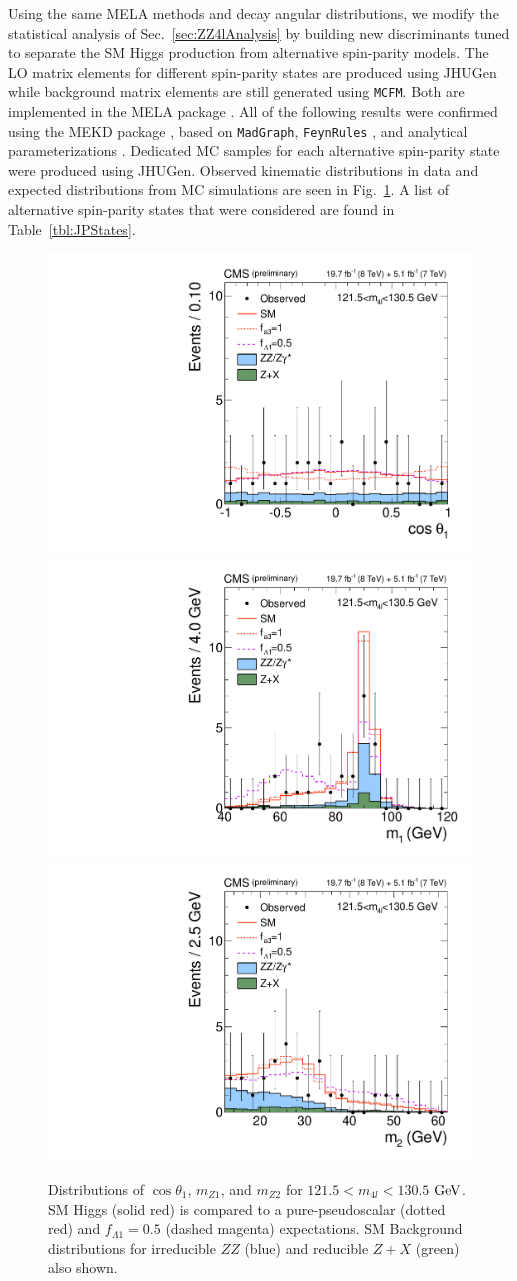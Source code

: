 Using the same MELA methods and decay angular distributions, we modify the statistical analysis of Sec.~\ref{sec:ZZ4lAnalysis} by building new discriminants tuned to separate the SM Higgs production from alternative spin-parity models. The LO matrix elements for different spin-parity states are produced using JHUGen while background matrix elements are still generated using {\tt MCFM}. Both are implemented in the MELA package \cite{Chatrchyan:2012ufa,Gao:2010qx,Bolognesi:2012mm,Anderson:2013afp}. All of the following results were confirmed using the MEKD package \cite{Avery:2012um}, based on {\tt MadGraph}, {\tt FeynRules} \cite{Christensen:2008py}, and analytical parameterizations \cite{Chen:2012jy,Chen:2014pia,Chen:2014gka}. Dedicated MC samples for each alternative spin-parity state were produced using JHUGen. Observed kinematic distributions in data and expected distributions from MC simulations are seen in Fig.~\ref{fig:SPKinDistributions}. A list of alternative spin-parity states that were considered are found in Table~\ref{tbl:JPStates}.

\begin{figure}[htbp]
\begin{center}
\includegraphics[width=.3\linewidth]{HiggsProperties/figures/cCompare_DataMC_AllTeV_helcosthetaZ1_SignalEnriched.pdf}
\includegraphics[width=.3\linewidth]{HiggsProperties/figures/cCompare_DataMC_AllTeV_Z1Mass_SignalEnriched.pdf}
\includegraphics[width=.3\linewidth]{HiggsProperties/figures/cCompare_DataMC_AllTeV_Z2Mass_SignalEnriched.pdf}
\caption[Kinematic Distributions for SM and Alternative Spin-Parity States near $125.6$ $\rm{GeV}$ Resonance]{Distributions of $\cos\theta_1$, $m_{Z1}$, and $m_{Z2}$ for $121.5<m_{4l}<130.5$ $\rm{GeV}$. SM Higgs (solid red) is compared to a pure-pseudoscalar (dotted red) and $f_{\Lambda 1}=0.5$ (dashed magenta) expectations. SM Background distributions for irreducible $ZZ$ (blue) and reducible $Z+X$ (green) also shown.}
\label{fig:SPKinDistributions}
\end{center}
\end{figure}

